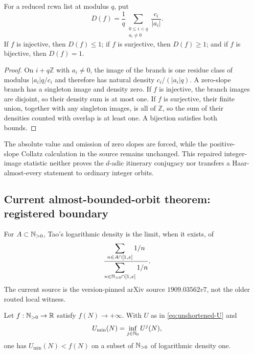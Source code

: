 \begin{proposition}
\label{prop:Kohl-density-repair}
For a reduced rcwa list at modulus $q$, put
\begin{equation}
\label{eq:Kohl-corrected-density}
 D(f)=\frac1q\sum_{\substack{0\leq i<q\\a_i\neq0}}
 \frac{c_i}{|a_i|}.
\end{equation}
If $f$ is injective, then $D(f)\leq1$; if $f$ is surjective, then
$D(f)\geq1$; and if $f$ is bijective, then $D(f)=1$.
\end{proposition}

\begin{proof}
On $i+q\mathbb Z$ with $a_i\neq0$, the image of the branch is one residue
class of modulus $|a_i|q/c_i$ and therefore has natural density
$c_i/(|a_i|q)$.  A zero-slope branch has a singleton image and density zero.
If $f$ is injective, the branch images are disjoint, so their density sum is at
most one.  If $f$ is surjective, their finite union, together with any singleton
images, is all of $\mathbb Z$, so the sum of their densities counted with
overlap is at least one.  A bijection satisfies both bounds.
\end{proof}

The absolute value and omission of zero slopes are forced, while the positive-
slope Collatz calculation in the source remains unchanged.  This repaired
integer-image statistic neither proves the $d$-adic itinerary conjugacy nor
transfers a Haar-almost-every statement to ordinary integer orbits.



\subsection{Current almost-bounded-orbit theorem: registered boundary}

For $A\subset\mathbb{N}_{>0}$, Tao's logarithmic density is the limit, when it exists,
of
\[
 \frac{\displaystyle\sum_{n\in A\cap[1,x]}1/n}
      {\displaystyle\sum_{n\in\mathbb{N}_{>0}\cap[1,x]}1/n}.
\]
The current source is the version-pinned arXiv source $1909.03562v7$, not the
older routed local witness.

\begin{theorem}
\label{thm:Tao-main-registered}
Let $f:\mathbb{N}_{>0}\to\mathbb R$ satisfy $f(N)\to+\infty$.  With $U$ as in
\eqref{eq:unshortened-U} and
\[
 U_{\min}(N)=\inf_{j\in\mathbb{N}_{0}}U^j(N),
\]
one has $U_{\min}(N)<f(N)$ on a subset of $\mathbb{N}_{>0}$ of logarithmic density one.
\end{theorem}

